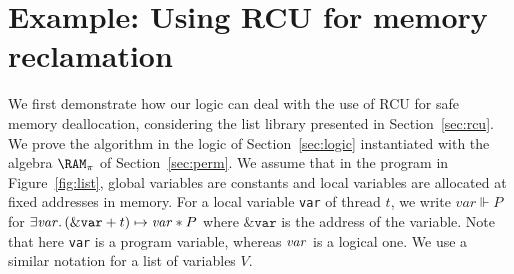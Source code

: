 \section{Example: Using RCU for memory reclamation\label{sec:list}}

We first demonstrate how our logic can deal with the use of RCU for safe memory
deallocation, considering the list library presented in
Section~\ref{sec:rcu}. We prove the algorithm in the logic of
Section~\ref{sec:logic} instantiated with the algebra $\RAM_{\pi}$ of
Section~\ref{sec:perm}. We assume that in the program in Figure~\ref{fig:list},
global variables are constants and local variables are allocated at fixed
addresses in memory. For a local variable {\tt var} of thread $t$, we write
$\mathit{var} \Vdash P$ for $\exists \mathit{var}.\, (\&{\tt var}+t) \mapsto
\mathit{var} * P$ where $\&\mathtt{var}$ is the address of the variable. Note
that here {\tt var} is a program variable, whereas ${\it var}$ is a logical
one. We use a similar notation for a list of variables $V$.



